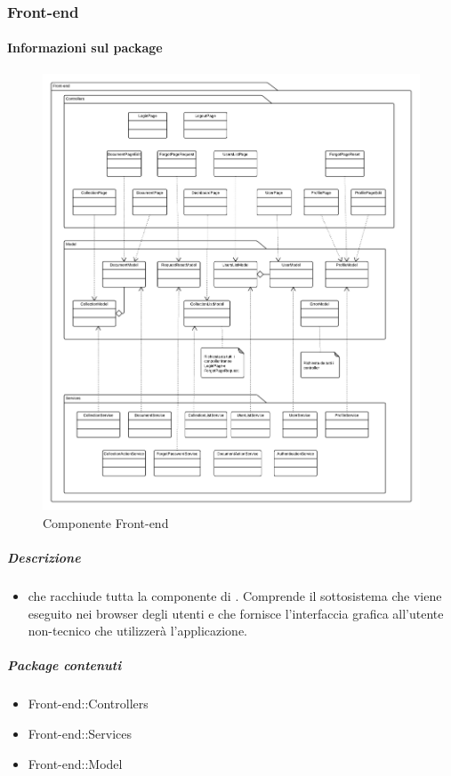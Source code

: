 
  \subsubsection{Front-end}
  \paragraph{Informazioni sul package}
    \begin{figure}[H] 
      \begin{center} 
        \includegraphics[width=\textwidth]{packages/Front-end.png}  
        \caption{Componente Front-end}
      \end{center}  
    \end{figure} 
  \subparagraph{Descrizione} 
    \begin{itemize}
    \item[]  che racchiude tutta la componente di . Comprende il sottosistema che viene eseguito nei browser degli utenti e che fornisce l'interfaccia grafica all'utente non-tecnico che utilizzerà l'applicazione.
    \end{itemize} 
    \subparagraph{Package contenuti} 
    \begin{itemize}
        \item Front-end::Controllers
        \item Front-end::Services
        \item Front-end::Model
    \end{itemize}
